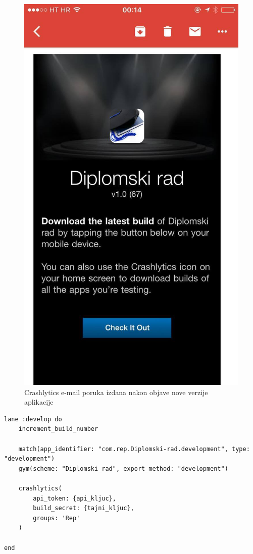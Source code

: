 \documentclass[times, utf8, diplomski, numeric]{fer}
\begin{document}
\begin{figure}[t!]
\centering
\includegraphics[scale=0.3]{CrashlyticsEmail}
\caption{Crashlytics e-mail poruka izdana nakon objave nove verzije aplikacije}
\label{fig:CrashlyticsEmail}
\end{figure}

\begin{lstlisting}[caption=Fastlane staza za isporuku korištenjem Crashlytics platforme, label=listing:crashlytics_deploy]
lane :develop do
    increment_build_number

    match(app_identifier: "com.rep.Diplomski-rad.development", type: "development")
    gym(scheme: "Diplomski_rad", export_method: "development")

    crashlytics(
        api_token: {api_kljuc},
        build_secret: {tajni_kljuc},
        groups: 'Rep'
    )

end
\end{lstlisting}
\end{document}
